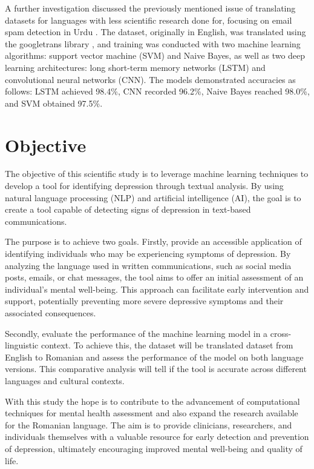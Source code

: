 A further investigation discussed the previously mentioned issue of translating datasets for languages with less scientific research done for, focusing on email spam detection in Urdu \cite{siddique2021machine}. The dataset, originally in English, was translated using the googletrans library \cite{googletranslib}, and training was conducted with two machine learning algorithms: support vector machine (SVM) and Naive Bayes, as well as two deep learning architectures: long short-term memory networks (LSTM) and convolutional neural networks (CNN). The models demonstrated accuracies as follows: LSTM achieved 98.4\%, CNN recorded 96.2\%, Naive Bayes reached 98.0\%, and SVM obtained 97.5\%.

\section{Objective}
\label{sec:ch1sec2}

\quad The objective of this scientific study is to leverage machine learning techniques to develop a tool for identifying depression through textual analysis. By using natural language processing (NLP) and artificial intelligence (AI), the goal is to create a tool capable of detecting signs of depression in text-based communications.

The purpose is to achieve two goals. Firstly, provide an accessible application of identifying individuals who may be experiencing symptoms of depression. By analyzing the language used in written communications, such as social media posts, emails, or chat messages, the tool aims to offer an initial assessment of an individual's mental well-being. This approach can facilitate early intervention and support, potentially preventing more severe depressive symptoms and their associated consequences.

Secondly, evaluate the performance of the machine learning model in a cross-linguistic context. To achieve this, the dataset will be translated dataset from English to Romanian and assess the performance of the model on both language versions. This comparative analysis will tell if the tool is accurate across different languages and cultural contexts.

With this study the hope is to contribute to the advancement of computational techniques for mental health assessment and also expand the research available for the Romanian language. The aim is to provide clinicians, researchers, and individuals themselves with a valuable resource for early detection and prevention of depression, ultimately encouraging improved mental well-being and quality of life.


